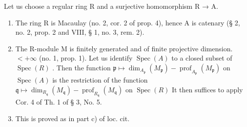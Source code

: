 Let us choose a regular ring R and a surjective homomorphism R → A.

\begin{enumerate}
\def\labelenumi{\alph{enumi})}
\item
  The ring R is Macaulay (no. 2, cor. 2 of prop. 4), hence A is catenary (§ 2, no. 2, prop. 2 and VIII, § 1, no. 3, rem. 2).
\item
  The R-module M is finitely generated and of finite projective dimension. \(< +\infty\) (no. 1, prop. 1). Let us identify \(\operatorname{Spec}(A)\) to a closed subset of \(\operatorname{Spec}(R)\) . Then the function \(\mathfrak{p} \mapsto \dim_{A_{\mathfrak{p}}} (M_{\mathfrak{p}}) - \operatorname{prof}_{A_{\mathfrak{p}}} (M_{\mathfrak{p}})\) on \(\operatorname{Spec}(A)\) is the restriction of the function \(\mathfrak{q} \mapsto \dim_{R_{\mathfrak{q}}} (M_{\mathfrak{q}}) - \operatorname{prof}_{R_{\mathfrak{q}}} (M_{\mathfrak{q}})\) on \(\operatorname{Spec}(R)\) It then suffices to apply Cor. 4 of Th. 1 of § 3, No. 5.
\item
  This is proved as in part c) of loc. cit.
\end{enumerate}

